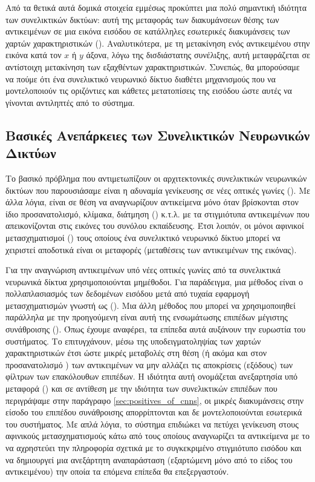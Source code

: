 Από τα θετικά αυτά δομικά στοιχεία εμμέσως προκύπτει μια πολύ σημαντική ιδιότητα των συνελικτικών δικτύων: αυτή της μεταφοράς των διακυμάνσεων θέσης των αντικειμένων σε μια εικόνα εισόδου σε κατάλληλες εσωτερικές διακυμάνσεις των χαρτών χαρακτηριστικών (). Αναλυτικότερα, με τη μετακίνηση ενός αντικειμένου στην εικόνα κατά τον $x$ ή $y$ άξονα, λόγω της δισδιάστατης συνέλιξης, αυτή μεταφράζεται σε αντίστοιχη μετακίνηση των εξαχθέντων χαρακτηριστικών. Συνεπώς, θα μπορούσαμε να πούμε ότι ένα συνελικτικό νευρωνικό δίκτυο διαθέτει μηχανισμούς που να μοντελοποιούν τις οριζόντιες και κάθετες μετατοπίσεις της εισόδου ώστε αυτές να γίνονται αντιληπτές από το σύστημα.

\subsection{Βασικές Ανεπάρκειες των Συνελικτικών Νευρωνικών Δικτύων}
Το βασικό πρόβλημα που αντιμετωπίζουν οι αρχιτεκτονικές συνελικτικών νευρωνικών δικτύων που παρουσιάσαμε είναι η αδυναμία γενίκευσης σε νέες οπτικές γωνίες (). Με άλλα λόγια, είναι σε θέση να αναγνωρίζουν αντικείμενα μόνο όταν βρίσκονται στον ίδιο προσανατολισμό, κλίμακα, διάτμηση () κ.τ.λ. με τα στιγμιότυπα αντικειμένων που απεικονίζονται στις εικόνες του συνόλου εκπαίδευσης. Έτσι λοιπόν, οι μόνοι αφινικοί μετασχηματισμοί () τους οποίους ένα συνελικτικό νευρωνικό δίκτυο μπορεί να χειριστεί αποδοτικά είναι οι μεταφορές (μεταθέσεις των αντικειμένων της εικόνας)\cite{sabour2017dynamic}.\par

Για την αναγνώριση αντικειμένων υπό νέες οπτικές γωνίες από τα συνελικτικά νευρωνικά δίκτυα χρησιμοποιούνται μη μέθοδοι. Για παράδειγμα, μια μέθοδος είναι ο πολλαπλασιασμός των δεδομένων εισόδου μετά από τυχαία εφαρμογή μετασχηματισμών γνωστή ως  (). Μια άλλη μέθοδος που μπορεί να χρησιμοποιηθεί παράλληλα με την προηγούμενη είναι αυτή της ενσωμάτωσης επιπέδων μέγιστης συνάθροισης (). Όπως έχουμε αναφέρει, τα επίπεδα αυτά αυξάνουν την ευρωστία του συστήματος. Το επιτυγχάνουν, μέσω της υποδειγματοληψίας των χαρτών χαρακτηριστικών έτσι ώστε μικρές μεταβολές στη θέση (ή ακόμα και στον προσανατολισμό \cite{geron2019hands}) των αντικειμένων να μην αλλάζει τις αποκρίσεις (εξόδους) των φίλτρων των επακόλουθων επιπέδων. Η ιδιότητα αυτή ονομάζεται ανεξαρτησία υπό μεταφορά () και σε αντίθεση με την ιδιότητα των συνελικτικών επιπέδων που περιγράψαμε στην παράγραφο \ref{sec:positives_of_cnns}, οι μικρές διακυμάνσεις στην είσοδο του επιπέδου συνάθροισης απορρίπτονται και δε μοντελοποιούνται εσωτερικά του συστήματος. Με απλά λόγια, το σύστημα επιδιώκει να πετύχει γενίκευση στους αφινικούς μετασχηματισμούς κάτω από τους οποίους αναγνωρίζει τα αντικείμενα με το να αχρηστεύει την πληροφορία σχετικά με το συγκεκριμένο στιγμιότυπο εισόδου και να δημιουργεί μια ανεξάρτητη αναπαράσταση (εξαρτώμενη μόνο από το είδος του αντικειμένου) την οποία τα επόμενα επίπεδα θα επεξεργαστούν.\par

